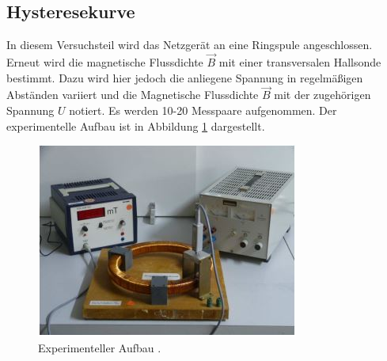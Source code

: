 \subsection{Hysteresekurve}
In diesem Versuchsteil wird das Netzgerät an eine Ringspule angeschlossen.
Erneut wird die magnetische Flussdichte $\vec{B}$ mit einer transversalen Hallsonde bestimmt.
Dazu wird hier jedoch die anliegene Spannung in regelmäßigen Abständen variiert und die Magnetische Flussdichte $\vec{B}$
mit der zugehörigen Spannung $U$ notiert.
Es werden 10-20 Messpaare aufgenommen.
Der experimentelle Aufbau ist in Abbildung \ref{A3} dargestellt.
\begin{figure}
  \centering
  \includegraphics{Text/Bilder/Aufbau3.jpg}
  \caption{Experimenteller Aufbau \cite[5]{sample}.}
  \label{A3}
\end{figure}
